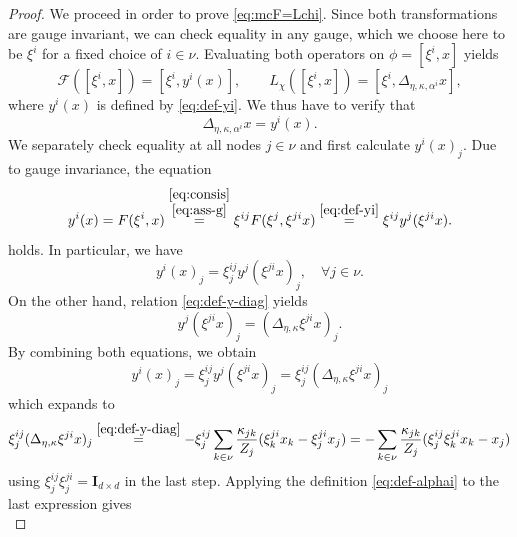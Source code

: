 \documentclass[10pt,a4paper]{amsart}
\newcommand{\II}{\mathbf{I}_{d \times d}}
\newcommand{\mc}[1]{\mathcal{#1}}
\begin{document}
\begin{proof}
		We proceed in order to prove \eqref{eq:mcF=Lchi}.
		Since both transformations are gauge invariant, we can check equality in any gauge, which we choose here to be $\xi^{i}$ for a fixed choice of $i \in \nu$. Evaluating both operators on $\phi = [\xi^{i},x]$ yields
		\begin{equation}
			\mc{F}([\xi^{i},x]) = [\xi^{i},y^{i}(x)], \qquad
			L_{\chi}([\xi^{i},x]) = [\xi^{i},\Delta_{\eta,\kappa,\alpha^{i}}x],
		\end{equation}
	 	where $y^{i}(x)$ is defined by \eqref{eq:def-yi}.
		We thus have to verify that
		\begin{equation}\label{eq:proof-show-Delta-y-i}\Delta_{\eta,\kappa,\alpha^{i}}x = y^{i}(x).
		\end{equation}
		We separately check equality at all nodes $j \in \nu$ and first calculate $y^{i}(x)_j$. Due to gauge invariance, the equation
		\begin{equation}
			y^{i}(x) = F(\xi^{i},x)
			\overset{
				\substack{
					\eqref{eq:consis} \\ \eqref{eq:ass-g}
				}
			}{=}
			\xi^{ij} F(\xi^{j},\xi^{ji}x)
			\overset{
				\eqref{eq:def-yi}
			}{=}
			\xi^{ij} y^{j}(\xi^{ji}x).
		\end{equation}
		holds. In particular, we have
		\begin{equation}
			y^{i}(x)_{j} = \xi^{ij}_{j} y^{j}(\xi^{ji}x)_{j}, \quad \forall j \in \nu.
		\end{equation}
		On the other hand, relation \eqref{eq:def-y-diag} yields
		\begin{equation}
			y^{j}(\xi^{ji} x)_{j} = (\Delta_{\eta,\kappa} \xi^{ji}x)_{j}.
		\end{equation}
		By combining both equations, we obtain
		\begin{equation}\label{eq:proof-F-L-aux-1}
			y^{i}(x)_{j}
			= \xi^{ij}_{j}y^{j}(\xi^{ji}x)_j
			= \xi^{ij}_{j}(\Delta_{\eta,\kappa} \xi^{ji}x )_{j}
		\end{equation}
		which expands to
		\begin{equation}
			\xi^{ij}_{j}(\Delta_{\eta,\kappa} \xi^{ji}x )_{j}
			\overset{\eqref{eq:def-y-diag}}{=}
			- \xi^{ij}_{j} \sum_{k\in \nu} \frac{\kappa_{jk}}{Z_{j}}(\xi^{ji}_{k} x_{k} - \xi^{ji}_{j} x_{j})
			=
			- \sum_{k \in \nu} \frac{\kappa_{jk}}{Z_{j}}(\xi^{ij}_{j}\xi^{ji}_{k}x_{k} - x_{j})
		\end{equation}
		using $\xi^{ij}_{j}\xi^{ji}_{j} = \II$ in the last step. Applying the definition \eqref{eq:def-alphai} to the last expression gives
		\begin{equation}\label{eq:proof-F-L-aux-2}

\end{equation}
\end{proof}
\end{document}
